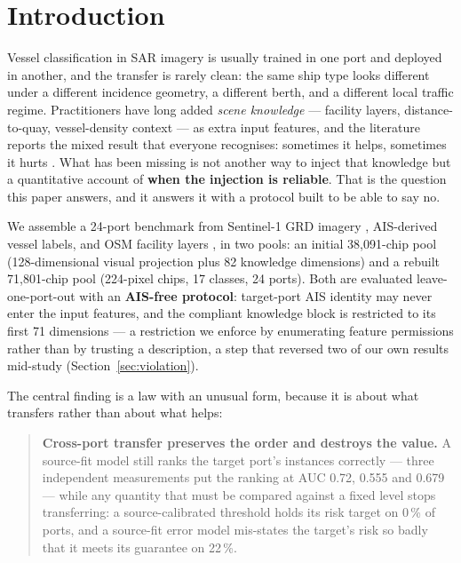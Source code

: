 \documentclass[journal]{IEEEtran}
\begin{document}
\section{Introduction}
\label{sec:intro}

Vessel classification in SAR imagery is usually trained in one port and deployed in another, and the
transfer is rarely clean: the same ship type looks different under a different incidence geometry, a
different berth, and a different local traffic regime. Practitioners have long added \emph{scene
knowledge} --- facility layers, distance-to-quay, vessel-density context --- as extra input features,
and the literature reports the mixed result that everyone recognises: sometimes it helps, sometimes it
hurts \cite{tuia2016domain,wang2020visualcontext}. What has been missing is not another way to inject
that knowledge but a quantitative account of \textbf{when the injection is reliable}. That is the
question this paper answers, and it answers it with a protocol built to be able to say no.

We assemble a 24-port benchmark from Sentinel-1 GRD imagery \cite{torres2012gmes}, AIS-derived vessel
labels, and OSM facility layers \cite{haklay2008osm}, in two pools: an initial 38{,}091-chip pool
(128-dimensional visual projection plus 82 knowledge dimensions) and a rebuilt 71{,}801-chip pool
(224-pixel chips, 17 classes, 24 ports). Both are evaluated leave-one-port-out with an
\textbf{AIS-free protocol}: target-port AIS identity may never enter the input features, and the
compliant knowledge block is restricted to its first 71 dimensions --- a restriction we enforce by
enumerating feature permissions rather than by trusting a description, a step that reversed two of our
own results mid-study (Section~\ref{sec:violation}).

The central finding is a law with an unusual form, because it is about what transfers rather than
about what helps:

\begin{quote}
\textbf{Cross-port transfer preserves the order and destroys the value.} A source-fit model still
ranks the target port's instances correctly --- three independent measurements put the ranking at AUC
0.72, 0.555 and 0.679 --- while any quantity that must be compared against a fixed level stops
transferring: a source-calibrated threshold holds its risk target on 0\,\% of ports, and a source-fit
error model mis-states the target's risk so badly that it meets its guarantee on 22\,\%.
\end{quote}
\end{document}
